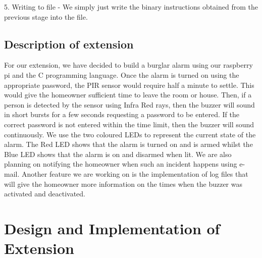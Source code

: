 \documentclass[11pt]{article}
\begin{document}
5. Writing to file - We simply just write the binary instructions obtained from the previous stage into the file.

\subsection{Description of extension}
For our extension, we have decided to build a burglar alarm using our raspberry pi and the C programming language.  Once the alarm is turned on using the appropriate password, the PIR sensor would require half a minute to settle. This would give the homeowner sufficient time to leave the room or house. Then, if a person is detected by the sensor using Infra Red rays, then the buzzer will sound in short bursts for a few seconds requesting a password to be entered. If the correct password is not entered within the time limit, then the buzzer will sound continuously. We use the two coloured LEDs to represent the current state of the alarm. The Red LED shows that the alarm is turned on and is armed whilst the Blue LED shows that the alarm is on and disarmed when lit. We are also planning on notifying the homeowner when such an incident happens using e-mail. Another feature we are working on is the implementation of log files that will give the homeowner more information on the times when the buzzer was activated and deactivated.

\section{Design and Implementation of Extension}
\end{document}
